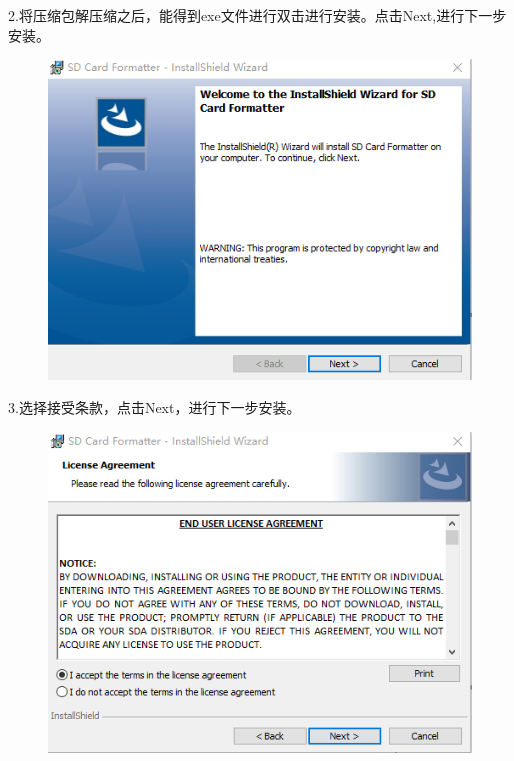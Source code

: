 \documentclass[openbib]{article}
\begin{document}
2.将压缩包解压缩之后，能得到exe文件进行双击进行安装。点击Next,进行下一步安装。
\begin{figure}[htbp]
	\centering
	\includegraphics[scale=0.3]{a3}
\end{figure}

3.选择接受条款，点击Next，进行下一步安装。
\begin{figure}[H]
	\centering
	\includegraphics[scale=0.4]{a4}
\end{figure}
\end{document}
